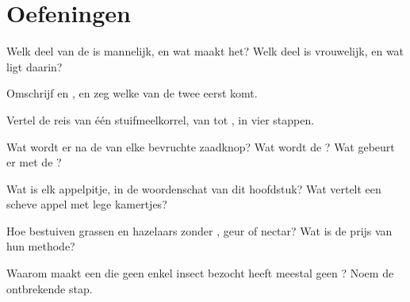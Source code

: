 \section{Oefeningen}

\begin{exercise}[$\star$]\label{exo:g5:flower-to-fruit:1}
Welk deel van de  is mannelijk, en wat maakt het? Welk deel is
vrouwelijk, en wat ligt daarin?
\end{exercise}

\begin{exercise}[$\star$]\label{exo:g5:flower-to-fruit:2}
Omschrijf  en , en zeg welke van de twee eerst komt.
\end{exercise}

\begin{exercise}[$\star$]\label{exo:g5:flower-to-fruit:3}
Vertel de reis van één stuifmeelkorrel, van  tot , in vier
stappen.
\end{exercise}

\begin{exercise}[$\star$]\label{exo:g5:flower-to-fruit:4}
Wat wordt er na de  van elke bevruchte zaadknop? Wat wordt de
? Wat gebeurt er met de ?
\end{exercise}

\begin{exercise}[$\star$]\label{exo:g5:flower-to-fruit:5}
Wat is elk appelpitje, in de woordenschat van dit hoofdstuk? Wat
vertelt een scheve appel met lege kamertjes?
\end{exercise}

\begin{exercise}[$\star$]\label{exo:g5:flower-to-fruit:6}
Hoe bestuiven grassen en hazelaars zonder , geur of nectar?
Wat is de prijs van hun methode?
\end{exercise}

\begin{exercise}[$\star$]\label{exo:g5:flower-to-fruit:7}
Waarom maakt een  die geen enkel insect bezocht heeft meestal geen
? Noem de ontbrekende stap.
\end{exercise}

